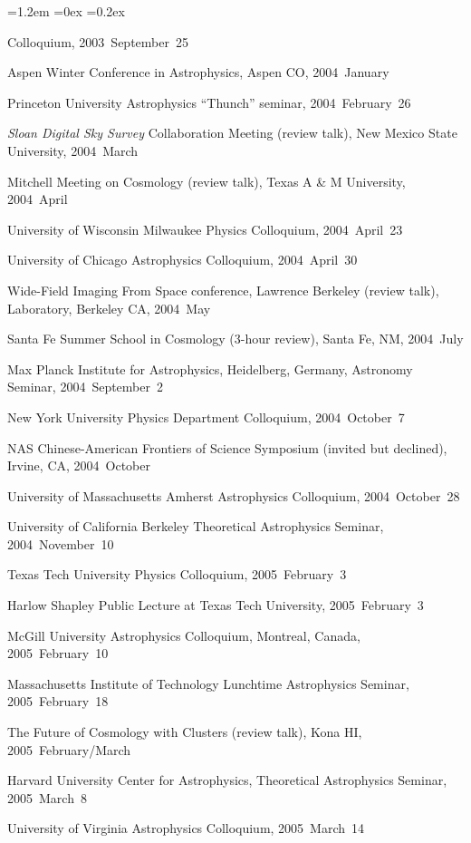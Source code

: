 \documentclass[10pt,letterpaper]{article}
\newcommand{\project}[1]{\textsl{#1}}
\newcounter{refpubnum}
\newcommand{\hogglist}{%
    \rightmargin=0in
    \leftmargin=1.2em
    \topsep=0ex
    \partopsep=0pt
    \itemsep=0.2ex
    \parsep=0pt
    \itemindent=-1.0\leftmargin
    \listparindent=0.0\leftmargin
    \settowidth{\labelsep}{~}
    \usecounter{refpubnum}
  }
\begin{document}
\begin{list}{}{\hogglist}
{          Colloquium,
          2003~September~25
\item Aspen Winter Conference in Astrophysics, Aspen CO,
          2004~January
\item Princeton University Astrophysics ``Thunch'' seminar,
          2004~February~26
\item \project{Sloan Digital Sky Survey} Collaboration Meeting (review talk),
          New Mexico State University, 2004~March
\item Mitchell Meeting on Cosmology (review talk), Texas A \& M University, 2004~April 
\item University of Wisconsin Milwaukee Physics Colloquium, 2004~April~23
\item University of Chicago Astrophysics Colloquium, 2004~April~30
\item Wide-Field Imaging From Space conference, Lawrence Berkeley
          (review talk), Laboratory, Berkeley CA, 2004~May
\item Santa Fe Summer School in Cosmology (3-hour review), Santa Fe, NM,
          2004~July
\item Max Planck Institute for Astrophysics, Heidelberg, Germany, Astronomy Seminar, 2004~September~2
\item New York University Physics Department Colloquium, 2004~October~7
\item NAS Chinese-American Frontiers of Science Symposium (invited but declined), Irvine, CA, 2004~October
\item University of Massachusetts Amherst Astrophysics Colloquium, 2004~October~28
\item University of California Berkeley Theoretical Astrophysics Seminar, 2004~November~10
\item Texas Tech University Physics Colloquium, 2005~February~3
\item Harlow Shapley Public Lecture at Texas Tech University, 2005~February~3
\item McGill University Astrophysics Colloquium, Montreal, Canada, 2005~February~10
\item Massachusetts Institute of Technology Lunchtime Astrophysics Seminar, 2005~February~18
\item The Future of Cosmology with Clusters (review talk), Kona HI, 2005~February/March
\item Harvard University Center for Astrophysics, Theoretical Astrophysics Seminar, 2005~March~8
\item University of Virginia Astrophysics Colloquium, 2005~March~14
}
\end{list}
\end{document}
